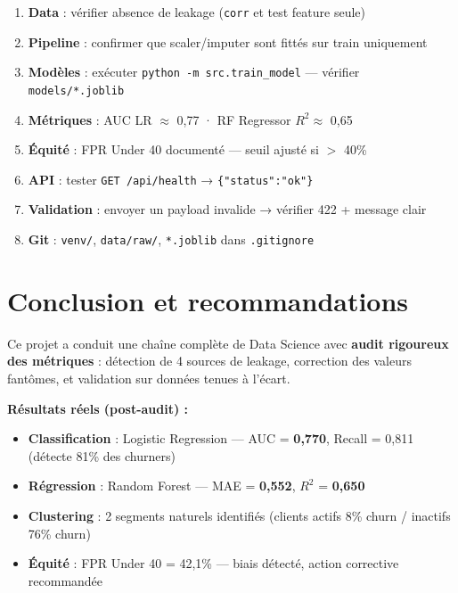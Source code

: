 \documentclass[11pt,a4paper]{article}
\begin{document}
\begin{tcolorbox}[title=Checklist avant mise en production, colframe=successgreen, colback=lightgreen, colbacktitle=successgreen]
\begin{enumerate}[noitemsep]
  \item \textbf{Data} : vérifier absence de leakage (\texttt{corr} et test feature seule)
  \item \textbf{Pipeline} : confirmer que scaler/imputer sont fittés sur train uniquement
  \item \textbf{Modèles} : exécuter \texttt{python -m src.train\_model} — vérifier \texttt{models/*.joblib}
  \item \textbf{Métriques} : AUC LR $\approx$ 0,77 · RF Regressor $R^2 \approx$ 0,65
  \item \textbf{Équité} : FPR Under 40 documenté — seuil ajusté si $>$ 40\%
  \item \textbf{API} : tester \texttt{GET /api/health} → \texttt{\{"status":"ok"\}}
  \item \textbf{Validation} : envoyer un payload invalide → vérifier 422 + message clair
  \item \textbf{Git} : \texttt{venv/}, \texttt{data/raw/}, \texttt{*.joblib} dans \texttt{.gitignore}
\end{enumerate}
\end{tcolorbox}

\section{Conclusion et recommandations}

Ce projet a conduit une chaîne complète de Data Science avec \textbf{audit rigoureux des métriques} : détection de 4 sources de leakage, correction des valeurs fantômes, et validation sur données tenues à l'écart.

\textbf{Résultats réels (post-audit) :}
\begin{itemize}[noitemsep]
  \item \textbf{Classification} : Logistic Regression — AUC = \textbf{0,770}, Recall = 0,811 (détecte 81\% des churners)
  \item \textbf{Régression} : Random Forest — MAE = \textbf{0,552}, $R^2$ = \textbf{0,650}
  \item \textbf{Clustering} : 2 segments naturels identifiés (clients actifs 8\% churn / inactifs 76\% churn)
  \item \textbf{Équité} : FPR Under 40 = 42,1\% — biais détecté, action corrective recommandée
\end{itemize}
\end{document}
